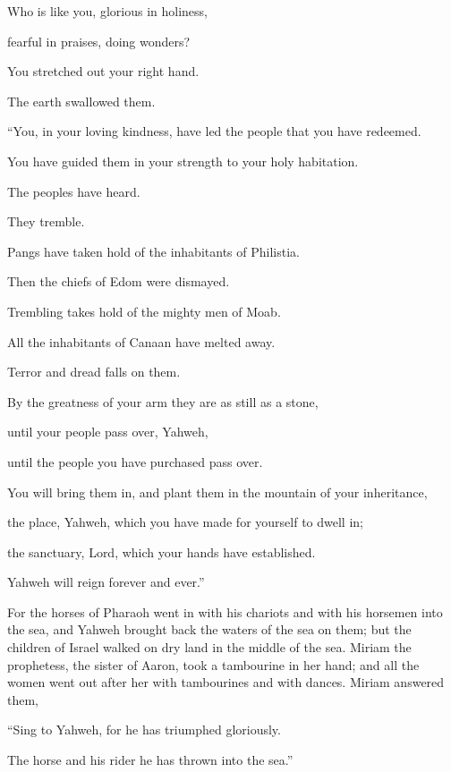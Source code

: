 {\par }{\QB Who is like you, glorious in holiness,
\par }{\QB fearful in praises, doing wonders?
\par }{\Q {}You stretched out your right hand.
\par }{\QB The earth swallowed them.
\par }{\Q {}“You, in your loving kindness, have led the people that you have redeemed.
\par }{\QB You have guided them in your strength to your holy habitation.
\par }{\Q {}The peoples have heard.
\par }{\QB They tremble.
\par }{\QB Pangs have taken hold of the inhabitants of Philistia.
\par }{\Q {}Then the chiefs of Edom were dismayed.
\par }{\QB Trembling takes hold of the mighty men of Moab.
\par }{\QB All the inhabitants of Canaan have melted away.
\par }{\Q {}Terror and dread falls on them.
\par }{\QB By the greatness of your arm they are as still as a stone,
\par }{\QB until your people pass over, Yahweh,
\par }{\QB until the people you have purchased pass over.
\par }{\QB {}You will bring them in, and plant them in the mountain of your inheritance,
\par }{\QB the place, Yahweh, which you have made for yourself to dwell in;
\par }{\QB the sanctuary, Lord, which your hands have established.
\par }{\Q {}Yahweh will reign forever and ever.”
\par }{\PP {}For the horses of Pharaoh went in with his chariots and with his horsemen into the sea, and Yahweh brought back the waters of the sea on them; but the children of Israel walked on dry land in the middle of the sea.
Miriam the prophetess, the sister of Aaron, took a tambourine in her hand; and all the women went out after her with tambourines and with dances.
Miriam answered them,
\par }{\Q “Sing to Yahweh, for he has triumphed gloriously.
\par }{\Q The horse and his rider he has thrown into the sea.”
}
